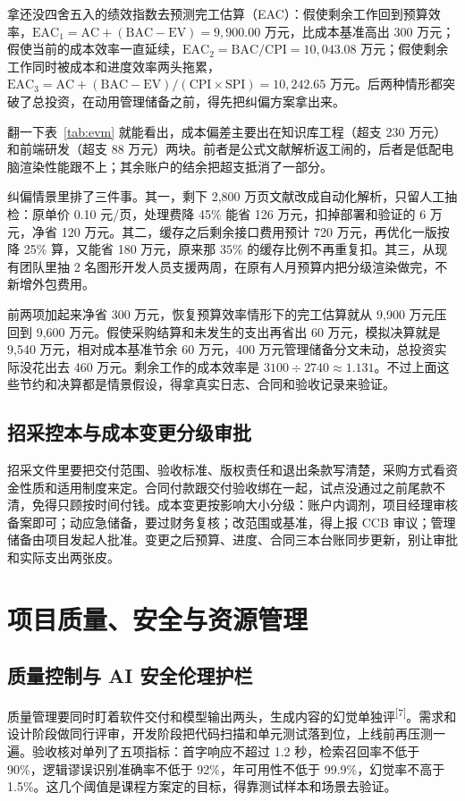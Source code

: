 \documentclass[UTF8,12pt,a4paper]{ctexart}
\begin{document}
拿还没四舍五入的绩效指数去预测完工估算（EAC）：假使剩余工作回到预算效率，$\mathrm{EAC}_1=\mathrm{AC}+(\mathrm{BAC}-\mathrm{EV})=9,900.00$ 万元，比成本基准高出 300 万元；假使当前的成本效率一直延续，$\mathrm{EAC}_2=\mathrm{BAC}/\mathrm{CPI}=10,043.08$ 万元；假使剩余工作同时被成本和进度效率两头拖累，$\mathrm{EAC}_3=\mathrm{AC}+(\mathrm{BAC}-\mathrm{EV})/(\mathrm{CPI}\times\mathrm{SPI})=10,242.65$ 万元。后两种情形都突破了总投资，在动用管理储备之前，得先把纠偏方案拿出来。

翻一下表~\ref{tab:evm} 就能看出，成本偏差主要出在知识库工程（超支 230 万元）和前端研发（超支 88 万元）两块。前者是公式文献解析返工闹的，后者是低配电脑渲染性能跟不上；其余账户的结余把超支抵消了一部分。

纠偏情景里排了三件事。其一，剩下 2,800 万页文献改成自动化解析，只留人工抽检：原单价 0.10 元/页，处理费降 45\% 能省 126 万元，扣掉部署和验证的 6 万元，净省 120 万元。其二，缓存之后剩余接口费用预计 720 万元，再优化一版按降 25\% 算，又能省 180 万元，原来那 35\% 的缓存比例不再重复扣。其三，从现有团队里抽 2 名图形开发人员支援两周，在原有人月预算内把分级渲染做完，不新增外包费用。

前两项加起来净省 300 万元，恢复预算效率情形下的完工估算就从 9,900 万元压回到 9,600 万元。假使采购结算和未发生的支出再省出 60 万元，模拟决算就是 9,540 万元，相对成本基准节余 60 万元，400 万元管理储备分文未动，总投资实际没花出去 460 万元。剩余工作的成本效率是 $3100\div 2740\approx 1.131$。不过上面这些节约和决算都是情景假设，得拿真实日志、合同和验收记录来验证。

\subsection{招采控本与成本变更分级审批}
招采文件里要把交付范围、验收标准、版权责任和退出条款写清楚，采购方式看资金性质和适用制度来定。合同付款跟交付验收绑在一起，试点没通过之前尾款不清，免得只顾按时间付钱。成本变更按影响大小分级：账户内调剂，项目经理审核备案即可；动应急储备，要过财务复核；改范围或基准，得上报 CCB 审议；管理储备由项目发起人批准。变更之后预算、进度、合同三本台账同步更新，别让审批和实际支出两张皮。

\section{项目质量、安全与资源管理}

\subsection{质量控制与 AI 安全伦理护栏}
质量管理要同时盯着软件交付和模型输出两头，生成内容的幻觉单独评\textsuperscript{[7]}。需求和设计阶段做同行评审，开发阶段把代码扫描和单元测试落到位，上线前再压测一遍。验收核对单列了五项指标：首字响应不超过 1.2 秒，检索召回率不低于 90\%，逻辑谬误识别准确率不低于 92\%，年可用性不低于 99.9\%，幻觉率不高于 1.5\%。这几个阈值是课程方案定的目标，得靠测试样本和场景去验证。
\end{document}
